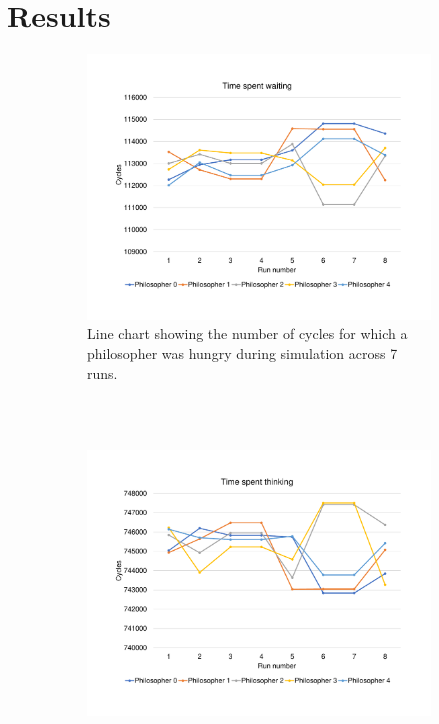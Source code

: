 \documentclass[a4,11pt]{article}
\begin{document}
\section{Results}
\begin{figure}[!ht]
  \centering
  \begin{subfigure}[b]{0.3\textwidth}
    \includegraphics[width=\textwidth]{./resources/waiting-chart.pdf}
    \caption{\sffamily Line chart showing the number of cycles for
      which a philosopher was hungry during simulation across 7
      runs.\\\\}
    \label{fig:waiting-chart} 
  \end{subfigure}
  ~
  \begin{subfigure}[b]{0.3\textwidth}
    \includegraphics[width=\textwidth]{./resources/thinking-chart.pdf}

\end{subfigure}
\end{figure}
\end{document}
